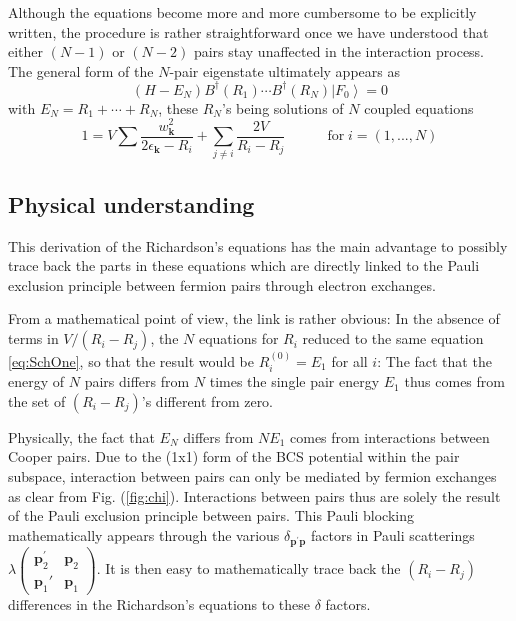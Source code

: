 \documentclass[aps,prb,superscriptaddress,showpacs,reprint,lengthcheck]{revtex4-1}
\newcommand{\vp}{\ensuremath{\mathbf{p}}}
\begin{document}
Although the equations become more and more cumbersome to be explicitly
written, the procedure is rather straightforward once we have understood
that either $(N-1)$ or $(N-2)$ pairs stay unaffected in the interaction process. The
general form of the $N$-pair eigenstate ultimately appears as 
\begin{equation}  \label{eq:SchThreeN}
(H-E _N)B^{\dagger}(R_1)\cdots{}B^{\dagger}(R_N)\left|F_0\right>  =0
\end{equation}
with $E _N=R_1+\cdots+R_N$, these $R_N$'s being solutions of $N$ coupled
equations 
\begin{equation}
1=V\sum\frac{w_{\mathbf{k} }^2}{2\epsilon_{\mathbf{k} }-R_i}+\sum_{j\neq{i}}%
\frac{2V}{R_i-R_j}\quad\qquad \text{for}\; i=\left(1,...,N\right) 
\end{equation}

\subsection{Physical understanding}

This  derivation of the Richardson's equations has the main advantage to
possibly trace back the parts in these equations which are directly linked
to the Pauli exclusion principle between fermion pairs through electron exchanges. 

From a mathematical point of view, the link is rather obvious: In the
absence of terms in $V/(R_i-R_j)$, the $N$ equations for $R_i$ reduced to
the same equation \eqref{eq:SchOne}, so that the result would be $R^{(0)}_i=%
E _1$ for all $i$: The fact that the energy of $N$ pairs differs
from $N$ times the single pair energy $E_1$ thus comes from the set of $(R_i-R_j)$'s
different from zero.

Physically, the fact that $E _N$ differs from $NE _1$
comes from interactions between Cooper pairs. Due to the (1x1) form of the BCS
potential within the pair subspace, interaction between pairs can only be mediated by fermion
exchanges as clear from Fig. (\ref{fig:chi}). 
Interactions between pairs thus
are solely the result of the Pauli exclusion principle between pairs. This
Pauli blocking mathematically appears through the various $\delta_{\mathbf{p}
^{\prime}\mathbf{p} }$ factors in Pauli scatterings $\lambda(%
\begin{smallmatrix}\vp^\prime_2&\vp_2\\\vp_1'&\vp_1\end{smallmatrix})  $. It
is then easy to mathematically trace back the $(R_i-R_j)$ differences
 in the Richardson's equations to these $\delta$ factors.
\end{document}
